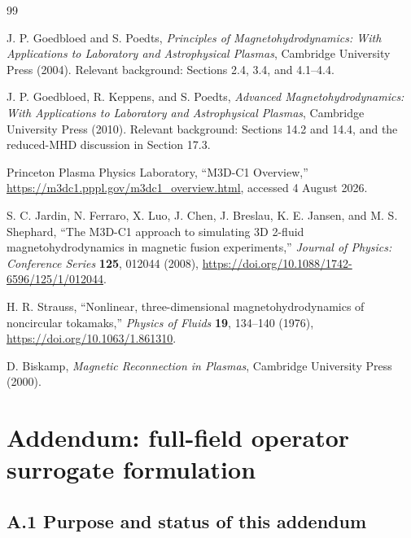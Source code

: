 \documentclass[11pt]{article}
\begin{document}
\clearpage
\begin{thebibliography}{99}

J. P. Goedbloed and S. Poedts,
\emph{Principles of Magnetohydrodynamics: With Applications to Laboratory and Astrophysical Plasmas},
Cambridge University Press (2004).
Relevant background: Sections 2.4, 3.4, and 4.1--4.4.

J. P. Goedbloed, R. Keppens, and S. Poedts,
\emph{Advanced Magnetohydrodynamics: With Applications to Laboratory and Astrophysical Plasmas},
Cambridge University Press (2010).
Relevant background: Sections 14.2 and 14.4, and the reduced-MHD discussion in Section 17.3.

Princeton Plasma Physics Laboratory,
``M3D-C1 Overview,''
\url{https://m3dc1.pppl.gov/m3dc1_overview.html},
accessed 4 August 2026.

S. C. Jardin, N. Ferraro, X. Luo, J. Chen, J. Breslau, K. E. Jansen, and M. S. Shephard,
``The M3D-C1 approach to simulating 3D 2-fluid magnetohydrodynamics in magnetic fusion experiments,''
\emph{Journal of Physics: Conference Series} \textbf{125}, 012044 (2008),
\url{https://doi.org/10.1088/1742-6596/125/1/012044}.

H. R. Strauss,
``Nonlinear, three-dimensional magnetohydrodynamics of noncircular tokamaks,''
\emph{Physics of Fluids} \textbf{19}, 134--140 (1976),
\url{https://doi.org/10.1063/1.861310}.

D. Biskamp,
\emph{Magnetic Reconnection in Plasmas},
Cambridge University Press (2000).

\end{thebibliography}



\clearpage
\section*{Addendum: full-field operator surrogate formulation}

\subsection*{A.1 Purpose and status of this addendum}
\end{document}
